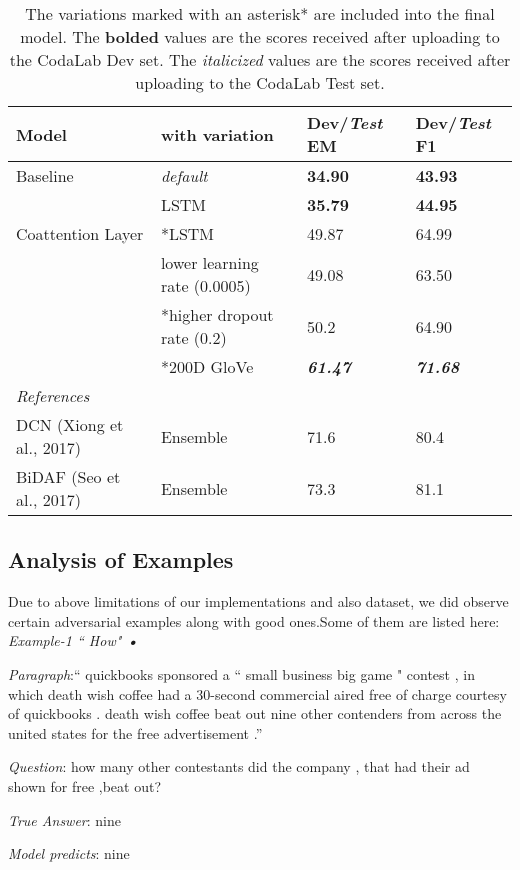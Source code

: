 \documentclass{article} %
\begin{document}
\begin{table}[hp!]
\centering
\begin{tabular}{ll|ll}
\toprule
Model & with variation & Dev/\textit{Test} EM & Dev/\textit{Test} F1 \\
\midrule
Baseline & \textit{default} & \textbf{34.90} & \textbf{43.93} \\
 & LSTM & \textbf{35.79} & \textbf{44.95} \\
\midrule
Coattention Layer & *LSTM & 49.87 & 64.99 \\
 & lower learning rate (0.0005) & 49.08 & 63.50 \\
 & *higher dropout rate (0.2) & 50.2 & 64.90 \\
 & *200D GloVe & \textit{\textbf{61.47}} & \textit{\textbf{71.68}} \\
\midrule
\textit{References} &&& \\
DCN (Xiong et al., 2017) & Ensemble & 71.6 & 80.4 \\
BiDAF (Seo et al., 2017) & Ensemble & 73.3 & 81.1 \\
\bottomrule
\end{tabular}
\caption{
The variations marked with an asterisk* are included into the final model.
The \textbf{bolded} values are the scores received after uploading to the CodaLab Dev set.
The \textit{italicized} values are the scores received after uploading to the CodaLab Test set.
}
\label{tab:scores}%
\end{table}

\subsection{Analysis of Examples}
Due to above limitations of our implementations and also dataset, we did observe certain adversarial examples along with good ones.Some of them are listed here:
\emph{\emph{Example-1 `` How"  \textbf{•}}}

\emph{Paragraph}:``  quickbooks sponsored a `` small business big game " contest , in which death wish coffee had a 30-second commercial aired free of charge courtesy of quickbooks . death wish coffee beat out nine other contenders from across the united states for the free advertisement .'' 

\emph{Question}: how many other contestants did the company , that had their ad shown for free ,beat out?

\emph{True Answer}: nine   

 \textit{Model predicts}: nine
\end{document}
